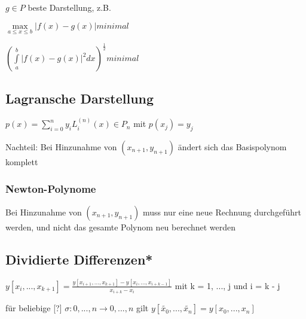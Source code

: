\documentclass[12pt,a4paper]{article} %
\begin{document}
	$g \in P$ beste Darstellung, z.B. 
	
	$\max\limits_{a \le x \le b}|f(x) - g(x)| minimal$
	
	$(\int\limits_{a}^{b}|f(x) - g(x)|^2dx)^{\frac{1}{2}} minimal$
	
	\subsection{Lagransche Darstellung}
	
	$p(x) = \sum\limits_{i = 0}^{n}y_iL_i^{(n)}(x) \in P_n$ mit $p(x_j) = y_j$
	
	Nachteil: Bei Hinzunahme von $(x_{n+1}, y_{n+1})$ ändert sich das Basispolynom komplett
	
	\subsubsection{Newton-Polynome}
	
	Bei Hinzunahme von $(x_{n + 1}, y_{n + 1})$ muss nur eine neue Rechnung durchgeführt werden, und nicht das gesamte Polynom neu berechnet werden
	
	\subsection{Dividierte Differenzen*}
	
	$y[x_i, ..., x_{k + 1}] = \frac{y[x_{i + 1}, ..., x_{k + 1}] - y[x_i, ..., x_{i + k - 1}]}{x_{i + k} - x_i}$ mit k = 1, ..., j und i = k - j
	
	für beliebige [?] $\sigma:{0, ..., n} \rightarrow {0, ..., n}$ gilt $y[\tilde{x_0}, ..., \tilde{x_n}] = y[x_0, ..., x_n]$
	
	
\end{document}
